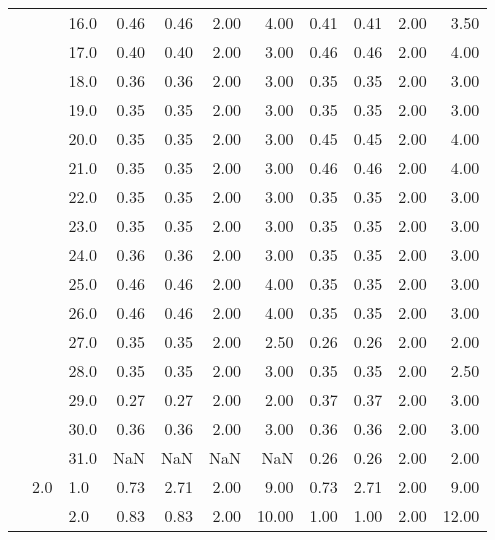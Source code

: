 \begin{tabular}{lllrrrrrrrr}
       &     & 16.0 &       0.46 &      0.46 & 2.00 &   4.00 &       0.41 &      0.41 & 2.00 &   3.50 \\
       &     & 17.0 &       0.40 &      0.40 & 2.00 &   3.00 &       0.46 &      0.46 & 2.00 &   4.00 \\
       &     & 18.0 &       0.36 &      0.36 & 2.00 &   3.00 &       0.35 &      0.35 & 2.00 &   3.00 \\
       &     & 19.0 &       0.35 &      0.35 & 2.00 &   3.00 &       0.35 &      0.35 & 2.00 &   3.00 \\
       &     & 20.0 &       0.35 &      0.35 & 2.00 &   3.00 &       0.45 &      0.45 & 2.00 &   4.00 \\
       &     & 21.0 &       0.35 &      0.35 & 2.00 &   3.00 &       0.46 &      0.46 & 2.00 &   4.00 \\
       &     & 22.0 &       0.35 &      0.35 & 2.00 &   3.00 &       0.35 &      0.35 & 2.00 &   3.00 \\
       &     & 23.0 &       0.35 &      0.35 & 2.00 &   3.00 &       0.35 &      0.35 & 2.00 &   3.00 \\
       &     & 24.0 &       0.36 &      0.36 & 2.00 &   3.00 &       0.35 &      0.35 & 2.00 &   3.00 \\
       &     & 25.0 &       0.46 &      0.46 & 2.00 &   4.00 &       0.35 &      0.35 & 2.00 &   3.00 \\
       &     & 26.0 &       0.46 &      0.46 & 2.00 &   4.00 &       0.35 &      0.35 & 2.00 &   3.00 \\
       &     & 27.0 &       0.35 &      0.35 & 2.00 &   2.50 &       0.26 &      0.26 & 2.00 &   2.00 \\
       &     & 28.0 &       0.35 &      0.35 & 2.00 &   3.00 &       0.35 &      0.35 & 2.00 &   2.50 \\
       &     & 29.0 &       0.27 &      0.27 & 2.00 &   2.00 &       0.37 &      0.37 & 2.00 &   3.00 \\
       &     & 30.0 &       0.36 &      0.36 & 2.00 &   3.00 &       0.36 &      0.36 & 2.00 &   3.00 \\
       &     & 31.0 &        NaN &       NaN &  NaN &    NaN &       0.26 &      0.26 & 2.00 &   2.00 \\
       & 2.0 & 1.0  &       0.73 &      2.71 & 2.00 &   9.00 &       0.73 &      2.71 & 2.00 &   9.00 \\
       &     & 2.0  &       0.83 &      0.83 & 2.00 &  10.00 &       1.00 &      1.00 & 2.00 &  12.00 \\

\end{tabular}
